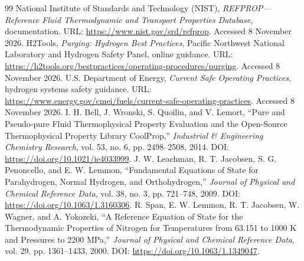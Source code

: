 \documentclass[12pt,a4paper,twoside,openright]{report}
\begin{document}
\begin{thebibliography}{99}
     National Institute of Standards and Technology (NIST), \textit{REFPROP---Reference Fluid Thermodynamic and Transport Properties Database}, documentation. URL: \url{https://www.nist.gov/srd/refprop}. Accessed 8 November 2026.
     H2Tools, \textit{Purging: Hydrogen Best Practices}, Pacific Northwest National Laboratory and Hydrogen Safety Panel, online guidance. URL: \url{https://h2tools.org/bestpractices/operating-procedures/purging}. Accessed 8 November 2026.
     U.S. Department of Energy, \textit{Current Safe Operating Practices}, hydrogen systems safety guidance. URL: \url{https://www.energy.gov/cmei/fuels/current-safe-operating-practices}. Accessed 8 November 2026.
     I. H. Bell, J. Wronski, S. Quoilin, and V. Lemort, ``Pure and Pseudo-pure Fluid Thermophysical Property Evaluation and the Open-Source Thermophysical Property Library CoolProp,'' \textit{Industrial \& Engineering Chemistry Research}, vol. 53, no. 6, pp. 2498--2508, 2014. DOI: \url{https://doi.org/10.1021/ie4033999}.
     J. W. Leachman, R. T. Jacobsen, S. G. Penoncello, and E. W. Lemmon, ``Fundamental Equations of State for Parahydrogen, Normal Hydrogen, and Orthohydrogen,'' \textit{Journal of Physical and Chemical Reference Data}, vol. 38, no. 3, pp. 721--748, 2009. DOI: \url{https://doi.org/10.1063/1.3160306}.
     R. Span, E. W. Lemmon, R. T. Jacobsen, W. Wagner, and A. Yokozeki, ``A Reference Equation of State for the Thermodynamic Properties of Nitrogen for Temperatures from 63.151 to 1000 K and Pressures to 2200 MPa,'' \textit{Journal of Physical and Chemical Reference Data}, vol. 29, pp. 1361--1433, 2000. DOI: \url{https://doi.org/10.1063/1.1349047}.
\end{thebibliography}

\cleardoublepage

\end{document}
